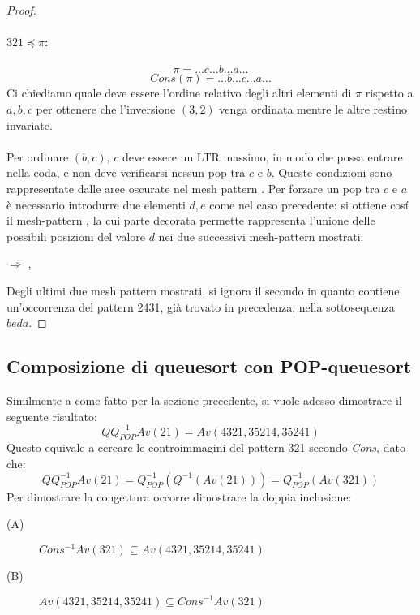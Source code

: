 \begin{proof}
\paragraph*{$321\preceq\pi$:}$$\pi=\dots c\dots b\dots a\dots$$$$Cons(\pi)=\dots b\dots c\dots a\dots$$
Ci chiediamo quale deve essere l'ordine relativo degli altri elementi di $\pi$ rispetto a $a,b,c$ per ottenere che l'inversione $(3,2)$ venga ordinata mentre le altre restino invariate.\\\\
Per ordinare $(b,c)$, $c$ deve essere un LTR massimo, in modo che possa entrare nella coda, e non deve verificarsi nessun pop tra $c$ e $b$. Queste condizioni sono rappresentate dalle aree oscurate nel mesh pattern . Per forzare un pop tra $c$ e $a$ \`e necessario introdurre due elementi $d,e$ come nel caso precedente: si ottiene cos\'i il mesh-pattern , la cui parte decorata permette rappresenta l'unione delle possibili posizioni del valore $d$ nei due successivi mesh-pattern mostrati:
\begin{center}
 $\Rightarrow$
,
\end{center}
Degli ultimi due mesh pattern mostrati, si ignora il secondo in quanto contiene un'occorrenza del pattern 2431, gi\`a trovato in precedenza, nella sottosequenza $beda$.
\end{proof}
\subsection*{Composizione di queuesort con POP-queuesort}
Similmente a come fatto per la sezione precedente, si vuole adesso dimostrare il seguente risultato:
$$QQ_{POP}^{-1}Av(21) = Av(4321, 35214, 35241)$$
Questo equivale a cercare le controimmagini del pattern 321 secondo \textit{Cons}, dato che:
$$QQ_{POP}^{-1}Av(21) = Q_{POP}^{-1}(Q^{-1}(Av(21))) = Q_{POP}^{-1}(Av(321))$$
Per dimostrare la congettura occorre dimostrare la doppia inclusione:
\begin{description}
\item[(A)]$Cons^{-1}Av(321) \subseteq Av(4321, 35214, 35241)$
\item[(B)]$Av(4321, 35214, 35241) \subseteq Cons^{-1}Av(321)$
\end{description}
